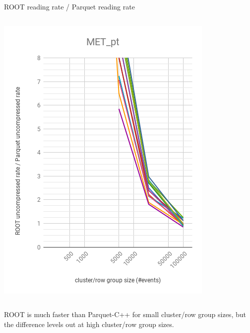 \documentclass[aspectratio=169]{beamer}
\begin{document}
\begin{frame}{ROOT reading rate / Parquet reading rate}
\begin{columns}
\begin{center}
\includegraphics[width=\linewidth]{root-none-parquet-none-MET_pt.png}
\end{center}
\end{columns}

\vspace{0.25 cm}
ROOT is much faster than Parquet-C++ for small cluster/row group sizes, but the difference levels out at high cluster/row group sizes.
\end{frame}
\end{document}
